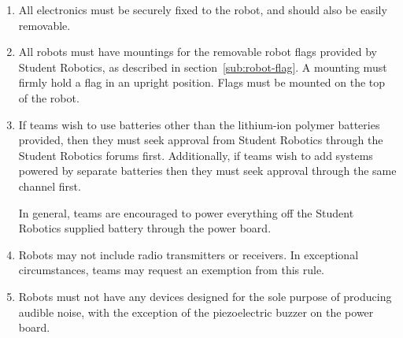 \begin{enumerate}
\item All electronics must be securely fixed to the robot, and should also be easily removable.

\item All robots must have mountings for the removable robot flags
      provided by Student Robotics, as described in section~\ref{sub:robot-flag}. A mounting
      must firmly hold a flag in an upright position. Flags must be mounted on the top of the robot.

\item If teams wish to use batteries other than the lithium-ion polymer batteries provided,
       then they must seek approval from Student Robotics through the Student Robotics forums first.
      Additionally, if teams wish to add systems powered by separate batteries then they must seek approval through the same channel first.

      In general, teams are encouraged to power everything off the Student Robotics supplied battery through the power board.

\item Robots may not include radio transmitters or receivers.
      In exceptional circumstances, teams may request an exemption from this rule.

\item Robots must not have any devices designed for the sole purpose of producing audible noise, with the exception of the piezoelectric buzzer on the power board.

\end{enumerate}
